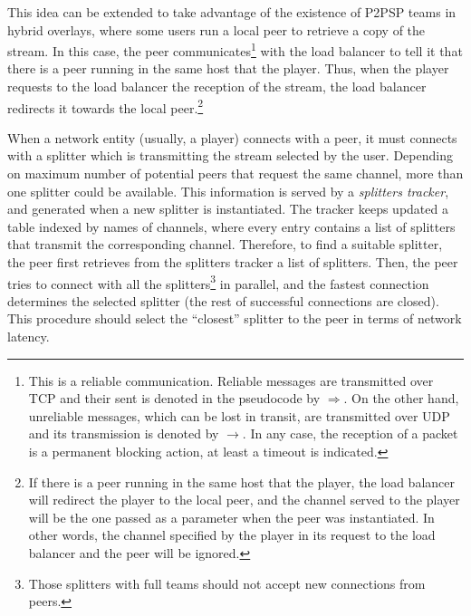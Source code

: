 This idea can be extended to take advantage of the existence of P2PSP
teams in hybrid overlays, where some users run a local peer to
retrieve a copy of the stream. In this case, the peer
communicates\footnote{This is a reliable communication. Reliable
  messages are transmitted over TCP and their sent is denoted in the
  pseudocode by $\Rightarrow$. On the other hand, unreliable messages,
  which can be lost in transit, are transmitted over UDP and its
  transmission is denoted by $\rightarrow$. In any case, the reception
  of a packet is a permanent blocking action, at least a timeout is
  indicated.} with the load balancer to tell it that there is a peer
running in the same host that the player. Thus, when the player
requests to the load balancer the reception of the stream, the load
balancer redirects it towards the local peer.\footnote{If there is a
  peer running in the same host that the player, the load balancer
  will redirect the player to the local peer, and the channel served
  to the player will be the one passed as a parameter when the peer
  was instantiated. In other words, the channel specified by the
  player in its request to the load balancer and the peer will be
  ignored.}

When a network entity (usually, a player) connects with a peer, it
must connects with a splitter which is transmitting the stream
selected by the user. Depending on maximum number of potential peers
that request the same channel, more than one splitter could be
available. This information is served by a \emph{splitters tracker},
and generated when a new splitter is instantiated. The tracker keeps
updated a table indexed by names of channels, where every entry
contains a list of splitters that transmit the corresponding
channel. Therefore, to find a suitable splitter, the peer first
retrieves from the splitters tracker a list of splitters. Then, the
peer tries to connect with all the splitters\footnote{Those splitters
  with full teams should not accept new connections from peers.} in
parallel, and the fastest connection determines the selected splitter
(the rest of successful connections are closed). This procedure should
select the ``closest'' splitter to the peer in terms of network
latency.


